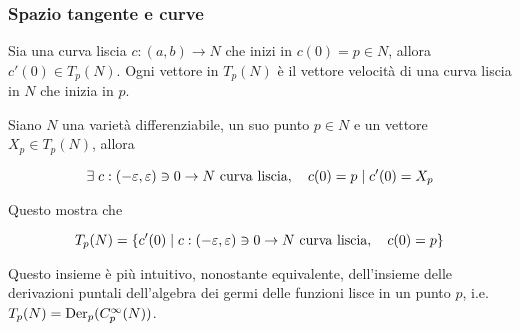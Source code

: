 \subsubsection{Spazio tangente e curve}

Sia una curva liscia $ c : (a,b) \to N $ che inizi in $ c(0) = p \in N $, allora $ c'(0) \in T_{p}(N) $. Ogni vettore in $ T_{p}(N) $ è il vettore velocità di una curva liscia in $ N $ che inizia in $ p $.

\begin{definition}
	Siano $ N $ una varietà differenziabile, un suo punto $ p \in N $ e un vettore $ X_{p} \in T_{p}(N) $, allora
	
	\begin{equation}
		\E c : (-\varepsilon,\varepsilon) \ni 0 \to N \text{ curva liscia} \qcomma c(0) = p \mid c'(0) = X_{p}
	\end{equation}

	Questo mostra che
	
	\begin{equation}
		T_{p}(N) = \{ c'(0) \mid c : (-\varepsilon,\varepsilon) \ni 0 \to N \text{ curva liscia} \qcomma c(0) = p \}
	\end{equation}
\end{definition}

Questo insieme è più intuitivo, nonostante equivalente, dell'insieme delle derivazioni puntali dell'algebra dei germi delle funzioni lisce in un punto $ p $, i.e. $ T_{p}(N) = \operatorname{Der}_{p}(C_{p}^{\infty}(N)) $.

